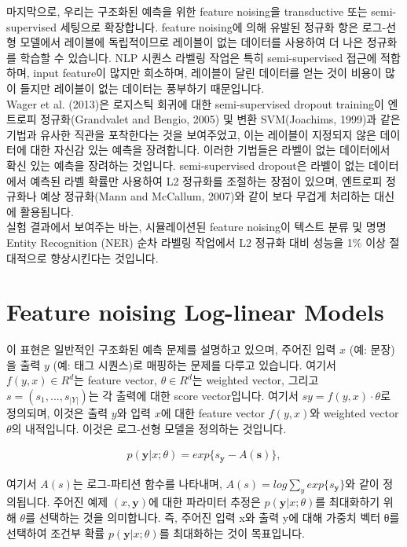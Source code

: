 \documentclass{article}
\begin{document}
마지막으로, 우리는 구조화된 예측을 위한 feature noising을 transductive 또는 semi-supervised 세팅으로 확장합니다. feature noising에 의해 유발된 정규화 항은 로그-선형 모델에서 레이블에 독립적이므로 레이블이 없는 데이터를 사용하여 더 나은 정규화를 학습할 수 있습니다. NLP 시퀀스 라벨링 작업은 특히 semi-supervised 접근에 적합하며, input feature이 많지만 희소하며, 레이블이 달린 데이터를 얻는 것이 비용이 많이 들지만 레이블이 없는 데이터는 풍부하기 때문입니다.\\

Wager et al. (2013)은 로지스틱 회귀에 대한 semi-supervised dropout training이 엔트로피 정규화(Grandvalet and Bengio, 2005) 및 변환 SVM(Joachims, 1999)과 같은 기법과 유사한 직관을 포착한다는 것을 보여주었고, 이는 레이블이 지정되지 않은 데이터에 대한 자신감 있는 예측을 장려합니다. 이러한 기법들은 라벨이 없는 데이터에서 확신 있는 예측을 장려하는 것입니다. semi-supervised dropout은 라벨이 없는 데이터에서 예측된 라벨 확률만 사용하여 L2 정규화를 조절하는 장점이 있으며, 엔트로피 정규화나 예상 정규화(Mann and McCallum, 2007)와 같이 보다 무겁게 처리하는 대신에 활용됩니다.\\

실험 결과에서 보여주는 바는, 시뮬레이션된 feature noising이 텍스트 분류 및 명명 Entity Recognition (NER) 순차 라벨링 작업에서 L2 정규화 대비 성능을 1\% 이상 절대적으로 향상시킨다는 것입니다.

\section{Feature noising Log-linear Models}
이 표현은 일반적인 구조화된 예측 문제를 설명하고 있으며, 주어진 입력 $x$ (예: 문장)을 출력 $y$ (예: 태그 시퀀스)로 매핑하는 문제를 다루고 있습니다. 여기서 $f(y, x) \in R^d$는 feature vector, $θ ∈ R^d$는 weighted vector, 그리고 $s = (s_1, . . . , s_|Y|)$는 각 출력에 대한 score vector입니다. 여기서 $sy = f(y, x) · θ$로 정의되며, 이것은 출력 $y$와 입력 $x$에 대한 feature vector $f(y, x)$와 weighted vector $θ$의 내적입니다. 이것은 로그-선형 모델을 정의하는 것입니다.

\begin{align}
    p(\textbf{y} \vert x ; \theta) = exp\{s_\textbf{y} - A(\textbf{s}) \},
\end{align}

여기서 $A(s)$는 로그-파티션 함수를 나타내며, $A(s) = log \sum_y exp\{s_\textbf{y}\}$와 같이 정의됩니다. 주어진 예제 $(x, \textbf{y})$에 대한 파라미터 추정은 $p(\textbf{y} | x; \theta)$를 최대화하기 위해 $\theta$를 선택하는 것을 의미합니다. 즉, 주어진 입력 x와 출력 y에 대해 가중치 벡터 θ를 선택하여 조건부 확률 $p(\textbf{y} | x; \theta)$를 최대화하는 것이 목표입니다.\\
\end{document}
